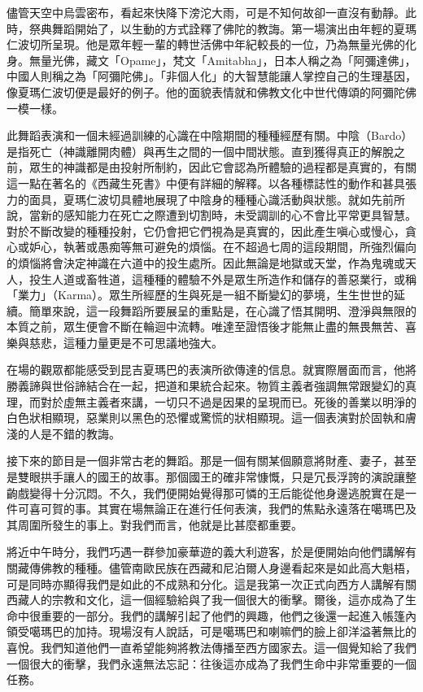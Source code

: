 儘管天空中烏雲密布，看起來快降下滂沱大雨，可是不知何故卻一直沒有動靜。此時，祭典舞蹈開始了，以生動的方式詮釋了佛陀的教誨。第一場演出由年輕的夏瑪仁波切所呈現。他是眾年輕一輩的轉世活佛中年紀較長的一位，乃為無量光佛的化身。無量光佛，藏文「Opame」，梵文「Amitabha」，日本人稱之為「阿彌達佛」，中國人則稱之為「阿彌陀佛」。「非個人化」的大智慧能讓人掌控自己的生理基因，像夏瑪仁波切便是最好的例子。他的面貌表情就和佛教文化中世代傳頌的阿彌陀佛一模一樣。

此舞蹈表演和一個未經過訓練的心識在中陰期間的種種經歷有關。中陰（Bardo）是指死亡（神識離開肉體）與再生之間的一個中間狀態。直到獲得真正的解脫之前，眾生的神識都是由投射所制約，因此它會認為所體驗的過程都是真實的，有關這一點在著名的《西藏生死書》中便有詳細的解釋。以各種標誌性的動作和甚具張力的面具，夏瑪仁波切具體地展現了中陰身的種種心識活動與狀態。就如先前所說，當新的感知能力在死亡之際遭到切割時，未受調訓的心不會比平常更具智慧。對於不斷改變的種種投射，它仍會把它們視為是真實的，因此產生嗔心或慢心，貪心或妒心，執著或愚痴等無可避免的煩惱。在不超過七周的這段期間，所強烈偏向的煩惱將會決定神識在六道中的投生處所。因此無論是地獄或天堂，作為鬼魂或天人，投生人道或畜牲道，這種種的體驗不外是眾生所造作和儲存的善惡業行，或稱「業力」（Karma）。眾生所經歷的生與死是一組不斷變幻的夢境，生生世世的延續。簡單來說，這一段舞蹈所要展呈的重點是，在心識了悟其開明、澄淨與無限的本質之前，眾生便會不斷在輪迴中流轉。唯達至證悟後才能無止盡的無畏無苦、喜樂與慈悲，這種力量更是不可思議地強大。

在場的觀眾都能感受到昆吉夏瑪巴的表演所欲傳達的信息。就實際層面而言，他將勝義諦與世俗諦結合在一起，把道和果統合起來。物質主義者強調無常跟變幻的真理，而對於虛無主義者來講，一切只不過是因果的呈現而已。死後的善業以明淨的白色狀相顯現，惡業則以黑色的恐懼或驚慌的狀相顯現。這一個表演對於固執和膚淺的人是不錯的教誨。

接下來的節目是一個非常古老的舞蹈。那是一個有關某個願意將財產、妻子，甚至是雙眼拱手讓人的國王的故事。那個國王的確非常慷慨，只是冗長浮誇的演說讓整齣戲變得十分沉悶。不久，我們便開始覺得那可憐的王后能從他身邊逃脫實在是一件可喜可賀的事。其實在場無論正在進行任何表演，我們的焦點永遠落在噶瑪巴及其周圍所發生的事上。對我們而言，他就是比甚麼都重要。

將近中午時分，我們巧遇一群參加豪華遊的義大利遊客，於是便開始向他們講解有關藏傳佛教的種種。儘管南歐民族在西藏和尼泊爾人身邊看起來是如此高大魁梧，可是同時亦顯得我們是如此的不成熟和分化。這是我第一次正式向西方人講解有關西藏人的宗教和文化，這一個經驗給與了我一個很大的衝擊。爾後，這亦成為了生命中很重要的一部分。我們的講解引起了他們的興趣，他們之後還一起進入帳篷內領受噶瑪巴的加持。現場沒有人說話，可是噶瑪巴和喇嘛們的臉上卻洋溢著無比的喜悅。我們知道他們一直希望能夠將教法傳播至西方國家去。這一個覺知給了我們一個很大的衝擊，我們永遠無法忘記：往後這亦成為了我們生命中非常重要的一個任務。

